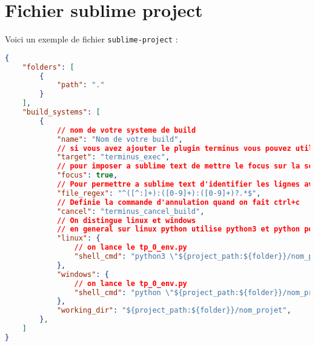 \documentclass[a4paper,12pt]{article}
\begin{document}
\section{Fichier sublime project}
\label{sec:fichier_sublime_project}
Voici un exemple de fichier \texttt{sublime-project} :
\begin{lstlisting}[language=json]
{
    "folders": [
        {
            "path": "."
        }
    ],
    "build_systems": [
        {
            // nom de votre systeme de build
            "name": "Nom de votre build",
            // si vous avez ajouter le plugin terminus vous pouvez utiliser cette extension
            "target": "terminus_exec",
            // pour imposer a sublime text de mettre le focus sur la sortie console 
            "focus": true,
            // Pour permettre a sublime text d'identifier les lignes avec des erreurs
            "file_regex": "^([^:]+):([0-9]+):([0-9]+)?.*$",
            // Definie la commande d'annulation quand on fait ctrl+c
            "cancel": "terminus_cancel_build",
            // On distingue linux et windows 
            // en general sur linux python utilise python3 et python pour window
            "linux": {
                // on lance le tp_0_env.py
                "shell_cmd": "python3 \"${project_path:${folder}}/nom_projet/tp_0_env.py\""
            },
            "windows": {
                // on lance le tp_0_env.py
                "shell_cmd": "python \"${project_path:${folder}}/nom_projet/tp_0_env.py\""
            },
            "working_dir": "${project_path:${folder}}/nom_projet",
        },
    ]
}
\end{lstlisting}
\end{document}
